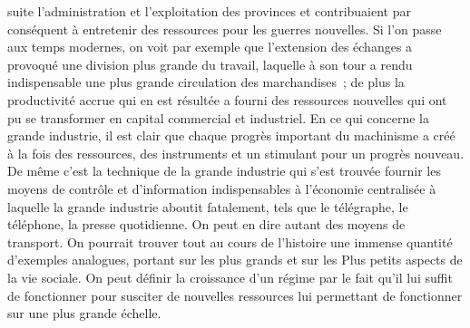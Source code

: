 \documentclass[french,twoside]{book} %
\begin{document}
suite l'administration et l'exploitation des provinces et contribuaient par conséquent à entretenir des ressources pour les guerres nouvelles. Si l'on passe aux temps modernes, on voit par exemple que l'extension des échanges a provoqué une division plus grande du travail, laquelle à son tour a rendu indispensable une plus grande circulation des marchandises ; de plus la productivité accrue qui en est résultée a fourni des ressources nouvelles qui ont pu se transformer en capital commercial et industriel. En ce qui concerne la grande industrie, il est clair que chaque progrès important du machinisme a créé à la fois des ressources, des instruments et un stimulant pour un progrès nouveau. De même c'est la technique de la grande industrie qui s'est trouvée fournir les moyens de contrôle et d'information indispensables à l'économie centralisée à laquelle la grande industrie aboutit fatalement, tels que le télégraphe, le téléphone, la presse quotidienne. On peut en dire autant des moyens de transport. On pourrait trouver tout au cours de l'histoire une immense quantité d'exemples analogues, portant sur les plus grands et sur les Plus petits aspects de la vie sociale. On peut définir la croissance d'un régime par le fait qu'il lui suffit de fonctionner pour susciter de nouvelles ressources lui permettant de fonctionner sur une plus grande échelle.\par
\end{document}
